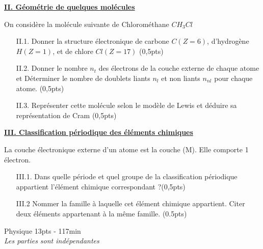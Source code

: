 \documentclass[12pt]{article}
\begin{document}
\begin{center}
\underline{\textbf{II. Géométrie de quelques molécules} }
\end{center}

On considère la molécule suivante de Chlorométhane $CH_3Cl$

\begin{enumerate}

	\item[II.1. ] Donner la structure électronique de carbone $C (Z=6)$, d’hydrogène $H (Z=1)$, et de chlore $Cl (Z=17)$ \dotfill(0,5pts)
	\item[II.2.]  Donner le nombre $n_t$ des électrons de la couche externe de chaque atome et Déterminer le nombre de doublets liants $n_l$ et non liants $n_{nl}$ pour chaque atome. \dotfill(0,5pts)

	\item[II.3.]  Représenter cette molécule selon le modèle de Lewis et déduire sa représentation de Cram \dotfill(0,5pts)

\end{enumerate}

\begin{center}
\underline{\textbf{III. Classification périodique des éléments chimiques } }
\end{center}

La couche électronique externe d'un atome est la couche (M). Elle comporte 1 électron. 
\begin{enumerate}

	\item[III.1.] Dans quelle période et quel groupe de la classification périodique appartient l'élément chimique correspondant ?\dotfill(0,5pts)
	\item[III.2] Nommer la famille à laquelle cet élément chimique appartient. Citer deux éléments appartenant à la
     même famille.  \dotfill(0.5pts)
\end{enumerate}





\begin{center}
    \vspace{0.5cm}
\hrulefill
\Large{Physique 13pts - 117min}
\hrulefill\\
	\emph{Les parties sont indépendantes}
\end{center}
\end{document}
